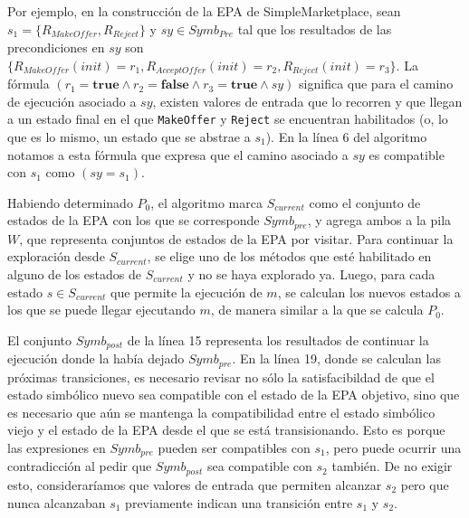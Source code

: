 Por ejemplo, en la construcción de la EPA de SimpleMarketplace, sean $s_1 = \{R_{MakeOffer},R_{Reject}\}$ y $ sy \in Symb_{Pre}$ tal que los resultados de las precondiciones en $sy$ son $\{R_{MakeOffer}(init) = r_1, R_{AcceptOffer}(init) = r_2, R_{Reject}(init) = r_3\}$.
La fórmula $(r_1 = \textbf{true} \land r_2 = \textbf{false} \land r_3 = \textbf{true} \land sy)$ significa que para el camino de ejecución asociado a $sy$, existen valores de entrada que lo recorren y que llegan a un estado final en el que \texttt{MakeOffer} y \texttt{Reject} se encuentran habilitados (o, lo que es lo mismo, un estado que se abstrae a $s_1$).
En la línea 6 del algoritmo notamos a esta fórmula que expresa que el camino asociado a $sy$ es compatible con $s_1$ como $(sy = s_1)$.

Habiendo determinado $P_0$, el algoritmo marca $S_{current}$ como el conjunto de estados de la EPA con los que se corresponde $Symb_{pre}$, y agrega ambos a la pila $W$, que representa conjuntos de estados de la EPA por visitar.
Para continuar la exploración desde $S_{current}$, se elige uno de los métodos que esté habilitado en alguno de los estados de $S_{current}$ y no se haya explorado ya.
Luego, para cada estado $s \in S_{current}$ que permite la ejecución de $m$, se calculan los nuevos estados a los que se puede llegar ejecutando $m$, de manera similar a la que se calcula $P_0$.

El conjunto $Symb_{post}$ de la línea 15 representa los resultados de continuar la ejecución donde la había dejado $Symb_{pre}$.
En la línea 19, donde se calculan las próximas transiciones, es necesario revisar no sólo la satisfacibildad de que el estado simbólico nuevo sea compatible con el estado de la EPA objetivo, sino que es necesario que aún se mantenga la compatibilidad entre el estado simbólico viejo y el estado de la EPA desde el que se está transisionando.
Esto es porque las expresiones en $Symb_{pre}$ pueden ser compatibles con $s_1$, pero puede ocurrir una contradicción al pedir que $Symb_{post}$ sea compatible con $s_2$ también.
De no exigir esto, consideraríamos que valores de entrada que permiten alcanzar $s_2$ pero que nunca alcanzaban $s_1$ previamente indican una transición entre $s_1$ y $s_2$.
